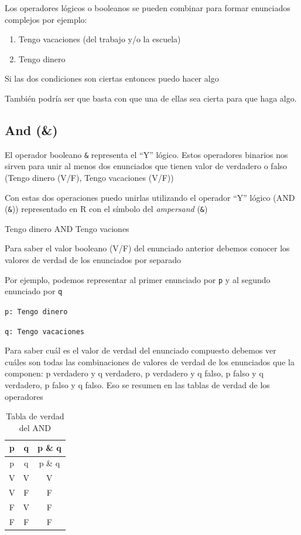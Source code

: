 \documentclass[
]{book}
\providecommand{\tightlist}{%
  \setlength{\itemsep}{0pt}\setlength{\parskip}{0pt}}
\begin{document}
Los operadores lógicos o booleanos se pueden combinar para formar enunciados complejos por ejemplo:

\begin{enumerate}
\def\labelenumi{\arabic{enumi}.}
\tightlist
\item
  Tengo vacaciones (del trabajo y/o la escuela)
\item
  Tengo dinero
\end{enumerate}

Si las dos condiciones son ciertas entonces puedo hacer algo

También podría ser que basta con que una de ellas sea cierta para que haga algo.

\subsection{And (\&)}\label{and}

El operador booleano \texttt{\&} representa el ``Y'' lógico. Estos operadores binarios nos sirven para unir al menos dos enunciados que tienen valor de verdadero o falso (Tengo dinero (V/F), Tengo vacaciones (V/F))

Con estas dos operaciones puedo unirlas utilizando el operador ``Y'' lógico (AND (\texttt{\&})) representado en R con el símbolo del \emph{ampersand} (\texttt{\&})

Tengo dinero AND Tengo vaciones

Para saber el valor booleano (V/F) del enunciado anterior debemos conocer los valores de verdad de los enunciados por separado

Por ejemplo, podemos representar al primer enunciado por \texttt{p} y al segundo enunciado por \texttt{q}

\texttt{p:\ Tengo\ dinero}

\texttt{q:\ Tengo\ vacaciones}

Para saber cuál es el valor de verdad del enunciado compuesto debemos ver cuáles son todas las combinaciones de valores de verdad de los enunciados que la componen: p verdadero y q verdadero, p verdadero y q falso, p falso y q verdadero, p falso y q falso. Eso se resumen en las tablas de verdad de los operadores

\begin{longtable}[]{@{}ccc@{}}
\caption{Tabla de verdad del AND}\tabularnewline
\toprule\noalign{}
p & q & p \& q \\
\midrule\noalign{}
\endfirsthead
\toprule\noalign{}
p & q & p \& q \\
\midrule\noalign{}
\endhead
\bottomrule\noalign{}
\endlastfoot
V & V & V \\
V & F & F \\
F & V & F \\
F & F & F \\
\end{longtable}
\end{document}
